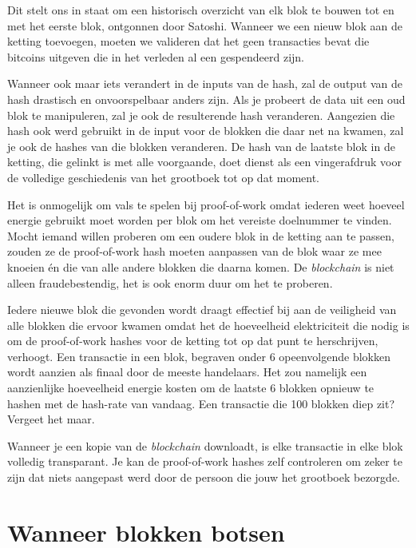 \documentclass[
  letterpaper,
]{scrbook}
\begin{document}
Dit stelt ons in staat om een historisch overzicht van elk blok te
bouwen tot en met het eerste blok, ontgonnen door Satoshi. Wanneer we
een nieuw blok aan de ketting toevoegen, moeten we valideren dat het
geen transacties bevat die bitcoins uitgeven die in het verleden al een
gespendeerd zijn.

Wanneer ook maar iets verandert in de inputs van de hash, zal de output
van de hash drastisch en onvoorspelbaar anders zijn. Als je probeert de
data uit een oud blok te manipuleren, zal je ook de resulterende hash
veranderen. Aangezien die hash ook werd gebruikt in de input voor de
blokken die daar net na kwamen, zal je ook de hashes van die blokken
veranderen. De hash van de laatste blok in de ketting, die gelinkt is
met alle voorgaande, doet dienst als een vingerafdruk voor de volledige
geschiedenis van het grootboek tot op dat moment.

Het is onmogelijk om vals te spelen bij proof-of-work omdat iederen weet
hoeveel energie gebruikt moet worden per blok om het vereiste doelnummer
te vinden. Mocht iemand willen proberen om een oudere blok in de ketting
aan te passen, zouden ze de proof-of-work hash moeten aanpassen van de
blok waar ze mee knoeien én die van alle andere blokken die daarna
komen. De \emph{blockchain} is niet alleen fraudebestendig, het is ook
enorm duur om het te proberen.

Iedere nieuwe blok die gevonden wordt draagt effectief bij aan de
veiligheid van alle blokken die ervoor kwamen omdat het de hoeveelheid
elektriciteit die nodig is om de proof-of-work hashes voor de ketting
tot op dat punt te herschrijven, verhoogt. Een transactie in een blok,
begraven onder 6 opeenvolgende blokken wordt aanzien als finaal door de
meeste handelaars. Het zou namelijk een aanzienlijke hoeveelheid energie
kosten om de laatste 6 blokken opnieuw te hashen met de hash-rate van
vandaag. Een transactie die 100 blokken diep zit? Vergeet het maar.

Wanneer je een kopie van de \emph{blockchain} downloadt, is elke
transactie in elke blok volledig transparant. Je kan de proof-of-work
hashes zelf controleren om zeker te zijn dat niets aangepast werd door
de persoon die jouw het grootboek bezorgde.

\hypertarget{wanneer-blokken-botsen}{%
\section{Wanneer blokken botsen}\label{wanneer-blokken-botsen}}
\end{document}
